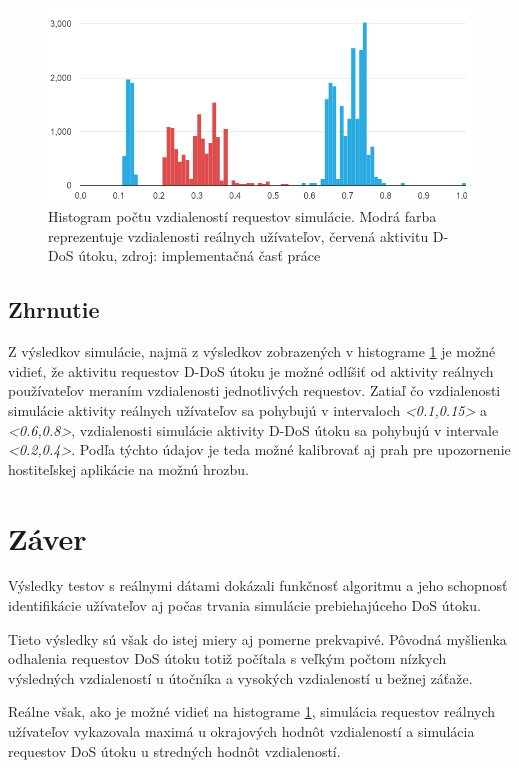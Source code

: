 \documentclass[
  digital, %
  table,   %
  lof,     %
  nolot,   %
  nocover
]{fithesis3}
\begin{document}
\begin{figure}[h]
  \centering
    \includegraphics[width=\textwidth]{images/data-histogram.png}
  \caption{Histogram počtu vzdialeností requestov simulácie. Modrá farba
  reprezentuje vzdialenosti reálnych užívateľov, červená aktivitu D-DoS útoku,
  zdroj: implementačná časť práce}
  \label{fig:data-histogram}
\end{figure}

\section{Zhrnutie}
Z výsledkov simulácie, najmä z výsledkov zobrazených v histograme
\ref{fig:data-histogram} je možné vidieť, že aktivitu requestov D-DoS útoku je
možné odlíšiť od aktivity reálnych používateľov meraním vzdialenosti
jednotlivých requestov. Zatiaľ čo vzdialenosti simulácie aktivity reálnych
užívateľov sa pohybujú v intervaloch \textit{<0.1,0.15>} a \textit{<0.6,0.8>},
vzdialenosti simulácie aktivity D-DoS útoku sa pohybujú v intervale
\textit{<0.2,0.4>}. Podľa týchto údajov je teda možné kalibrovať aj prah pre
upozornenie hostiteľskej aplikácie na možnú hrozbu. 

\chapter{Záver}
Výsledky testov s reálnymi dátami dokázali funkčnosť algoritmu a jeho schopnosť
identifikácie užívateľov aj počas trvania simulácie prebiehajúceho DoS útoku.

Tieto výsledky sú však do istej miery aj pomerne prekvapivé. Pôvodná myšlienka
odhalenia requestov DoS útoku totiž počítala s veľkým počtom nízkych výsledných
vzdialeností u útočníka a vysokých vzdialeností u bežnej záťaže. 

Reálne však, ako je možné vidieť na histograme \ref{fig:data-histogram},
simulácia requestov reálnych užívateľov vykazovala maximá u okrajových hodnôt
vzdialeností a simulácia requestov DoS útoku u stredných hodnôt vzdialeností. 
\end{document}
